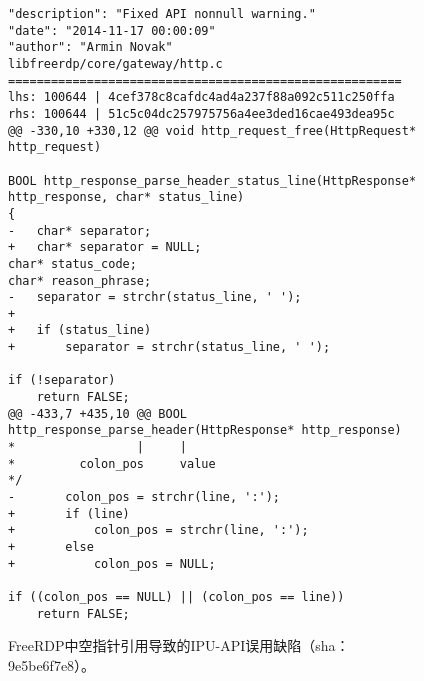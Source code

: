 \begin{figure}[b]
	\centering
\begin{lstlisting}
"description": "Fixed API nonnull warning."
"date": "2014-11-17 00:00:09"
"author": "Armin Novak"
libfreerdp/core/gateway/http.c
=======================================================
lhs: 100644 | 4cef378c8cafdc4ad4a237f88a092c511c250ffa
rhs: 100644 | 51c5c04dc257975756a4ee3ded16cae493dea95c
@@ -330,10 +330,12 @@ void http_request_free(HttpRequest* http_request)

BOOL http_response_parse_header_status_line(HttpResponse* http_response, char* status_line)
{
-	char* separator;
+	char* separator = NULL;
char* status_code;
char* reason_phrase;
-	separator = strchr(status_line, ' ');
+
+	if (status_line)
+		separator = strchr(status_line, ' ');

if (!separator)
	return FALSE;
@@ -433,7 +435,10 @@ BOOL http_response_parse_header(HttpResponse* http_response)
*                 |     |
*         colon_pos     value
*/
-		colon_pos = strchr(line, ':');
+		if (line)
+			colon_pos = strchr(line, ':');
+		else
+			colon_pos = NULL;

if ((colon_pos == NULL) || (colon_pos == line))
	return FALSE;

\end{lstlisting}
	\caption{
	FreeRDP中空指针引用导致的IPU-API误用缺陷（sha：9e5be6f7e8）。
	}
	\label{fig:2-3-ipu-1}
\end{figure}